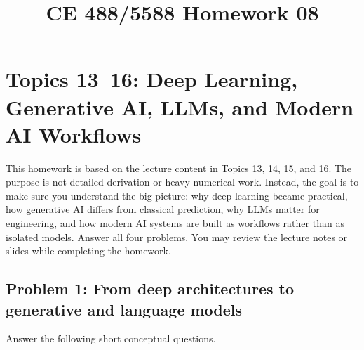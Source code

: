 \documentclass[12pt]{article}
\begin{document}
\title{CE 488/5588 Homework 08\\
\vspace{2in}
\author{}
}
\maketitle
\newpage

\section*{Topics 13--16: Deep Learning, Generative AI, LLMs, and Modern AI Workflows}

\begin{ch-box}
This homework is based on the lecture content in Topics 13, 14, 15, and 16. The purpose is not detailed derivation or heavy numerical work. Instead, the goal is to make sure you understand the big picture: why deep learning became practical, how generative AI differs from classical prediction, why LLMs matter for engineering, and how modern AI systems are built as workflows rather than as isolated models. Answer all four problems. You may review the lecture notes or slides while completing the homework.
\end{ch-box}

\subsection*{Problem 1: From deep architectures to generative and language models}
Answer the following short conceptual questions.
\end{document}
